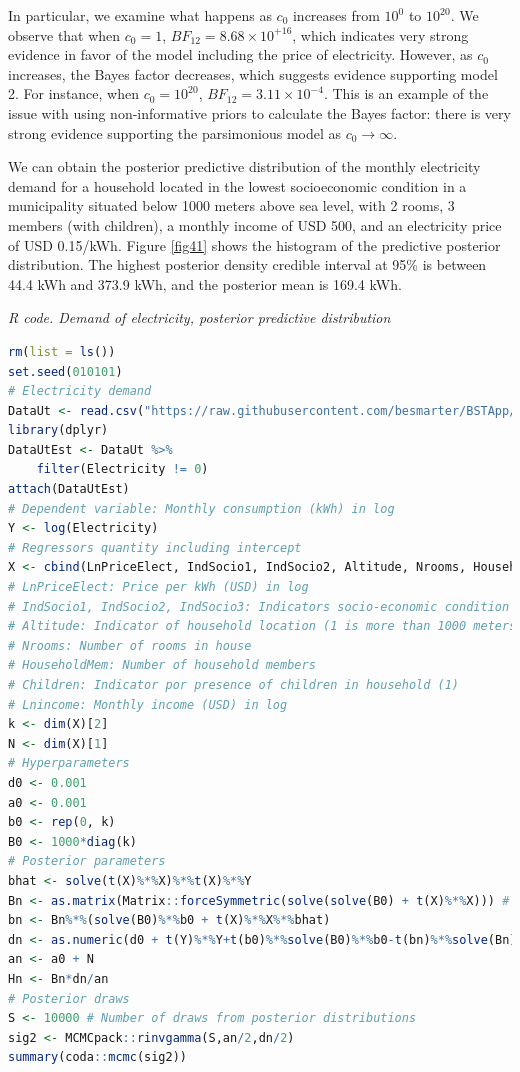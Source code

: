 In particular, we examine what happens as $c_0$ increases from $10^{0}$ to $10^{20}$. We observe that when $c_0 = 1$, $BF_{12} = 8.68 \times 10^{+16}$, which indicates very strong evidence in favor of the model including the price of electricity. However, as $c_0$ increases, the Bayes factor decreases, which suggests evidence supporting model 2. For instance, when $c_0 = 10^{20}$, $BF_{12} = 3.11 \times 10^{-4}$. This is an example of the issue with using non-informative priors to calculate the Bayes factor: there is very strong evidence supporting the parsimonious model as $c_0 \rightarrow \infty$.

We can obtain the posterior predictive distribution of the monthly electricity demand for a household located in the lowest socioeconomic condition in a municipality situated below 1000 meters above sea level, with 2 rooms, 3 members (with children), a monthly income of USD 500, and an electricity price of USD 0.15/kWh. Figure \ref{fig41} shows the histogram of the predictive posterior distribution. The highest posterior density credible interval at 95\% is between 44.4 kWh and 373.9 kWh, and the posterior mean is 169.4 kWh.    

\begin{tcolorbox}[enhanced,width=4.67in,center upper,
	fontupper=\large\bfseries,drop shadow southwest,sharp corners]
	\textit{R code. Demand of electricity, posterior predictive distribution}
	\begin{VF}
		\begin{lstlisting}[language=R]
rm(list = ls())
set.seed(010101)
# Electricity demand
DataUt <- read.csv("https://raw.githubusercontent.com/besmarter/BSTApp/refs/heads/master/DataApp/Utilities.csv", sep = ",", header = TRUE, quote = "")
library(dplyr)
DataUtEst <- DataUt %>% 
	filter(Electricity != 0)
attach(DataUtEst)
# Dependent variable: Monthly consumption (kWh) in log
Y <- log(Electricity) 
# Regressors quantity including intercept
X <- cbind(LnPriceElect, IndSocio1, IndSocio2, Altitude, Nrooms, HouseholdMem, Children, Lnincome, 1)
# LnPriceElect: Price per kWh (USD) in log
# IndSocio1, IndSocio2, IndSocio3: Indicators socio-economic condition (1) is the lowest and (3) the highest
# Altitude: Indicator of household location (1 is more than 1000 meters above sea level)
# Nrooms: Number of rooms in house
# HouseholdMem: Number of household members
# Children: Indicator por presence of children in household (1)
# Lnincome: Monthly income (USD) in log
k <- dim(X)[2]
N <- dim(X)[1]
# Hyperparameters
d0 <- 0.001
a0 <- 0.001
b0 <- rep(0, k)
B0 <- 1000*diag(k)
# Posterior parameters
bhat <- solve(t(X)%*%X)%*%t(X)%*%Y
Bn <- as.matrix(Matrix::forceSymmetric(solve(solve(B0) + t(X)%*%X))) # Force this matrix to be symmetric
bn <- Bn%*%(solve(B0)%*%b0 + t(X)%*%X%*%bhat)
dn <- as.numeric(d0 + t(Y)%*%Y+t(b0)%*%solve(B0)%*%b0-t(bn)%*%solve(Bn)%*%bn)
an <- a0 + N
Hn <- Bn*dn/an
# Posterior draws
S <- 10000 # Number of draws from posterior distributions
sig2 <- MCMCpack::rinvgamma(S,an/2,dn/2)
summary(coda::mcmc(sig2))
\end{lstlisting}
	\end{VF}
\end{tcolorbox} 


